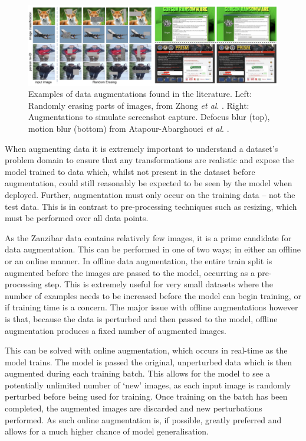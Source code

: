 \begin{figure}[h]
	\begin{center}
		\includegraphics[scale=0.45]{Chapter3/figs/data-augs.png}
	\end{center}
	\caption[Examples of data augmentations found in the literature.]{Examples of data augmentations found in the literature. Left: Randomly erasing parts of images, from Zhong \textit{et al}. \cite{zhong_random_2017}. Right: Augmentations to simulate screenshot capture. Defocus blur (top), motion blur (bottom) from Atapour-Abarghouei \textit{et al}. \cite{atapour-abarghouei_kings_2019}.}
	\label{fig:data-aug-examples}
\end{figure}

When augmenting data it is extremely important to understand a dataset's problem domain to ensure that any transformations are realistic and expose the model trained to data which, whilst not present in the dataset before augmentation, could still reasonably be expected to be seen by the model when deployed. Further, augmentation must only occur on the training data -- not the test data. This is in contrast to pre-processing techniques such as resizing, which must be performed over all data points. 

As the Zanzibar data contains relatively few images, it is a prime candidate for data augmentation. This can be performed in one of two ways; in either an offline or an online manner. In offline data augmentation, the entire train split is augmented before the images are passed to the model, occurring as a pre-processing step. This is extremely useful for very small datasets where the number of examples needs to be increased before the model can begin training, or if training time is a concern. The major issue with offline augmentations however is that, because the data is perturbed and then passed to the model, offline augmentation produces a fixed number of augmented images. 

This can be solved with online augmentation, which occurs in real-time as the model trains. The model is passed the original, unperturbed data which is then augmented during each training batch. This allows for the model to see a potentially unlimited number of `new' images, as each input image is randomly perturbed before being used for training. Once training on the batch has been completed, the augmented images are discarded and new perturbations performed. As such online augmentation is, if possible, greatly preferred and allows for a much higher chance of model generalisation. 

